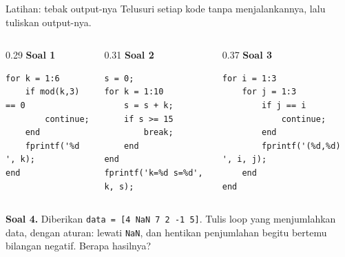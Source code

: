\documentclass[aspectratio=169,10pt]{beamer}
\newcommand{\codesize}{\footnotesize}
\newcommand{\kode}[1]{\texttt{#1}}
\begin{document}
\begin{frame}[fragile]{Latihan: tebak output-nya}
  \renewcommand{\codesize}{\scriptsize}
  Telusuri setiap kode \alert{tanpa menjalankannya}, lalu tuliskan output-nya.
  \vspace{4pt}
  \begin{columns}[T]
    \begin{column}{0.29\textwidth}
      \textbf{Soal 1}
\begin{lstlisting}
for k = 1:6
    if mod(k,3) == 0
        continue;
    end
    fprintf('%d ', k);
end
\end{lstlisting}
    \end{column}
    \begin{column}{0.31\textwidth}
      \textbf{Soal 2}
\begin{lstlisting}
s = 0;
for k = 1:10
    s = s + k;
    if s >= 15
        break;
    end
end
fprintf('k=%d s=%d', k, s);
\end{lstlisting}
    \end{column}
    \begin{column}{0.37\textwidth}
      \textbf{Soal 3}
\begin{lstlisting}
for i = 1:3
    for j = 1:3
        if j == i
            continue;
        end
        fprintf('(%d,%d) ', i, j);
    end
end
\end{lstlisting}
    \end{column}
  \end{columns}
  \vspace{8pt}
  \textbf{Soal 4.} Diberikan \kode{data = [4 NaN 7 2 -1 5]}. Tulis loop yang menjumlahkan data, dengan
  aturan: lewati \kode{NaN}, dan hentikan penjumlahan begitu bertemu bilangan negatif.
  Berapa hasilnya?
\end{frame}
\end{document}
